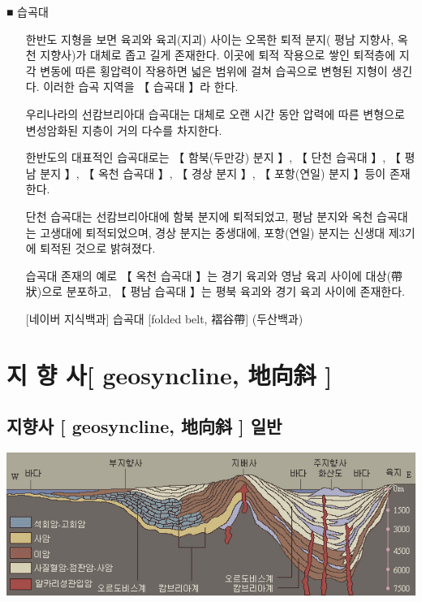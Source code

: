 \documentclass[12pt,a4paper]{book}
\newcommand{\SectionMargin}			{\newpage  \null \vskip 0cm}
\begin{document}
■ 습곡대
	\begin{enumerate}[itemsep=-0.5em]
	\item[]	한반도 지형을 보면 육괴와 육괴(지괴) 사이는 오목한 퇴적 분지( 평남 지향사, 옥천 지향사)가 대체로 좁고 길게 존재한다. 
			이곳에 퇴적 작용으로 쌓인 퇴적층에 지각 변동에 따른 횡압력이 작용하면 넓은 범위에 걸쳐 습곡으로 변형된 지형이 생긴다. 
			이러한 습곡 지역을 【 습곡대 】라 한다. 
	\item[]	
	\item[]	우리나라의 선캄브리아대 습곡대는 대체로 오랜 시간 동안 압력에 따른 변형으로 변성암화된 지층이 거의 다수를 차지한다.
	\item[]	
	\item[]	한반도의 대표적인 습곡대로는 【 함북(두만강) 분지 】, 【 단천 습곡대 】, 【 평남 분지 】, 【 옥천 습곡대 】, 
			【 경상 분지 】, 【 포항(연일) 분지 】등이 존재한다. 
	\item[]	
	\item[]	단천 습곡대는 선캄브리아대에 함북 분지에 퇴적되었고, 평남 분지와 옥천 습곡대는 고생대에 퇴적되었으며, 
			경상 분지는 중생대에, 포항(연일) 분지는 신생대 제3기에 퇴적된 것으로 밝혀졌다.
	\item[]	
	\item[]	습곡대 존재의 예로 【 옥천 습곡대 】는 경기 육괴와 영남 육괴 사이에 대상(帶狀)으로 분포하고, 
			【 평남 습곡대 】는 평북 육괴와 경기 육괴 사이에 존재한다.
	\item[]	[네이버 지식백과] 습곡대 [folded belt, 褶谷帶] (두산백과)
	\end{enumerate}




\newpage
\chapter{지 향 사[ geosyncline, 地向斜 ]}


	\SectionMargin
	\section{	지향사 [ geosyncline, 地向斜 ] 일반 }



	\includegraphics[width=1.0\textwidth]{./fig/geosyncline-001.jpg}	
\end{document}
